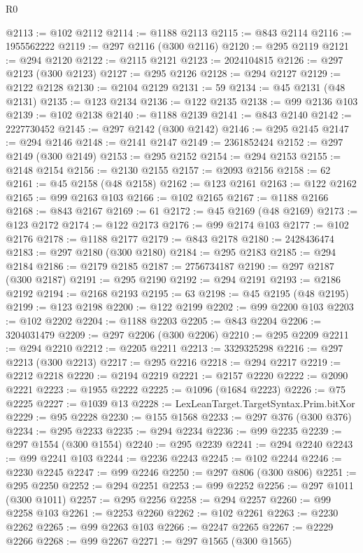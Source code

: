 \begin{lexlean}{R0}
\begin{coremodule}
@2113 := @102 @2112
@2114 := @1188 @2113
@2115 := @843 @2114
@2116 := 1955562222
@2119 := @297 @2116 (@300 @2116)
@2120 := @295 @2119
@2121 := @294 @2120
@2122 := @2115 @2121
@2123 := 2024104815
@2126 := @297 @2123 (@300 @2123)
@2127 := @295 @2126
@2128 := @294 @2127
@2129 := @2122 @2128
@2130 := @2104 @2129
@2131 := 59
@2134 := @45 @2131 (@48 @2131)
@2135 := @123 @2134
@2136 := @122 @2135
@2138 := @99 @2136 @103
@2139 := @102 @2138
@2140 := @1188 @2139
@2141 := @843 @2140
@2142 := 2227730452
@2145 := @297 @2142 (@300 @2142)
@2146 := @295 @2145
@2147 := @294 @2146
@2148 := @2141 @2147
@2149 := 2361852424
@2152 := @297 @2149 (@300 @2149)
@2153 := @295 @2152
@2154 := @294 @2153
@2155 := @2148 @2154
@2156 := @2130 @2155
@2157 := @2093 @2156
@2158 := 62
@2161 := @45 @2158 (@48 @2158)
@2162 := @123 @2161
@2163 := @122 @2162
@2165 := @99 @2163 @103
@2166 := @102 @2165
@2167 := @1188 @2166
@2168 := @843 @2167
@2169 := 61
@2172 := @45 @2169 (@48 @2169)
@2173 := @123 @2172
@2174 := @122 @2173
@2176 := @99 @2174 @103
@2177 := @102 @2176
@2178 := @1188 @2177
@2179 := @843 @2178
@2180 := 2428436474
@2183 := @297 @2180 (@300 @2180)
@2184 := @295 @2183
@2185 := @294 @2184
@2186 := @2179 @2185
@2187 := 2756734187
@2190 := @297 @2187 (@300 @2187)
@2191 := @295 @2190
@2192 := @294 @2191
@2193 := @2186 @2192
@2194 := @2168 @2193
@2195 := 63
@2198 := @45 @2195 (@48 @2195)
@2199 := @123 @2198
@2200 := @122 @2199
@2202 := @99 @2200 @103
@2203 := @102 @2202
@2204 := @1188 @2203
@2205 := @843 @2204
@2206 := 3204031479
@2209 := @297 @2206 (@300 @2206)
@2210 := @295 @2209
@2211 := @294 @2210
@2212 := @2205 @2211
@2213 := 3329325298
@2216 := @297 @2213 (@300 @2213)
@2217 := @295 @2216
@2218 := @294 @2217
@2219 := @2212 @2218
@2220 := @2194 @2219
@2221 := @2157 @2220
@2222 := @2090 @2221
@2223 := @1955 @2222
@2225 := @1096 (@1684 @2223)
@2226 := @75 @2225
@2227 := @1039 @13
@2228 := LexLeanTarget.TargetSyntax.Prim.bitXor
@2229 := @95 @2228
@2230 := @155 @1568
@2233 := @297 @376 (@300 @376)
@2234 := @295 @2233
@2235 := @294 @2234
@2236 := @99 @2235
@2239 := @297 @1554 (@300 @1554)
@2240 := @295 @2239
@2241 := @294 @2240
@2243 := @99 @2241 @103
@2244 := @2236 @2243
@2245 := @102 @2244
@2246 := @2230 @2245
@2247 := @99 @2246
@2250 := @297 @806 (@300 @806)
@2251 := @295 @2250
@2252 := @294 @2251
@2253 := @99 @2252
@2256 := @297 @1011 (@300 @1011)
@2257 := @295 @2256
@2258 := @294 @2257
@2260 := @99 @2258 @103
@2261 := @2253 @2260
@2262 := @102 @2261
@2263 := @2230 @2262
@2265 := @99 @2263 @103
@2266 := @2247 @2265
@2267 := @2229 @2266
@2268 := @99 @2267
@2271 := @297 @1565 (@300 @1565)

\end{coremodule}
\end{lexlean}
